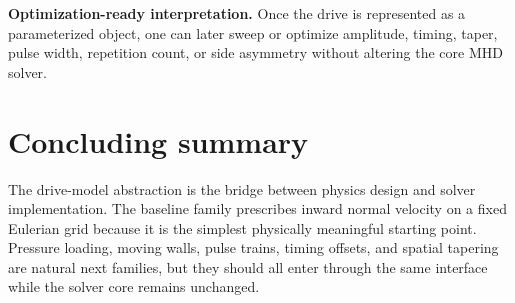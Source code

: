 \documentclass[11pt]{article}
\begin{document}
\begin{keybox}
\textbf{Optimization-ready interpretation.} Once the drive is represented as a parameterized object, one can later sweep or optimize amplitude, timing, taper, pulse width, repetition count, or side asymmetry without altering the core MHD solver.
\end{keybox}

\section{Concluding summary}
The drive-model abstraction is the bridge between physics design and solver implementation. The baseline family prescribes inward normal velocity on a fixed Eulerian grid because it is the simplest physically meaningful starting point. Pressure loading, moving walls, pulse trains, timing offsets, and spatial tapering are natural next families, but they should all enter through the same interface while the solver core remains unchanged.
\end{document}
